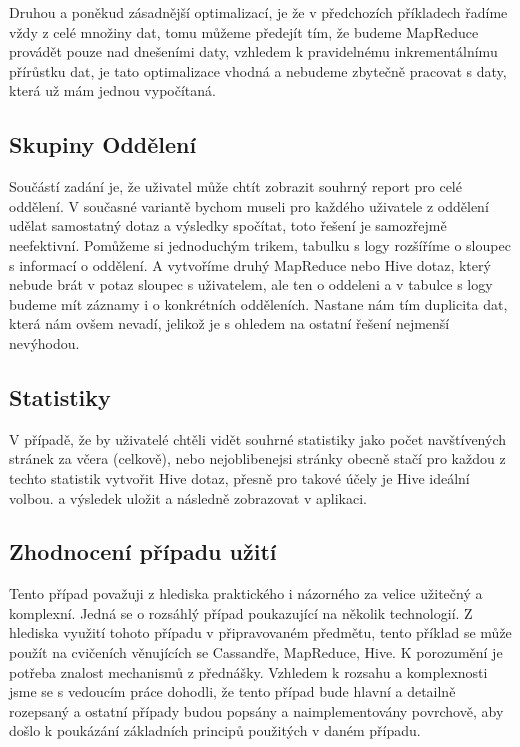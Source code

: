 Druhou a poněkud zásadnější optimalizací, je že v předchozích příkladech řadíme vždy z celé množiny dat, tomu můžeme předejít tím, že budeme MapReduce provádět pouze nad dnešeními daty, vzhledem k pravidelnému inkrementálnímu přírůstku dat, je tato optimalizace vhodná a nebudeme zbytečně pracovat s daty, která už mám jednou vypočítaná. 

\subsection{Skupiny Oddělení}
Součástí zadání je, že uživatel může chtít zobrazit souhrný report pro celé oddělení. V současné variantě bychom museli pro každého uživatele z oddělení udělat samostatný dotaz a výsledky spočítat, toto řešení je samozřejmě neefektivní. Pomůžeme si jednoduchým trikem, tabulku s logy rozšíříme o sloupec s informací o oddělení. A vytvoříme druhý MapReduce nebo Hive dotaz, který nebude brát v potaz sloupec s uživatelem, ale ten o oddeleni a v tabulce s logy budeme mít záznamy i o konkrétních odděleních. Nastane nám tím duplicita dat, která nám ovšem nevadí, jelikož je s ohledem na ostatní řešení nejmenší nevýhodou. 

\subsection{Statistiky}
V případě, že by uživatelé chtěli vidět souhrné statistiky jako počet navštívených stránek za včera (celkově), nebo nejoblibenejsi stránky obecně stačí pro každou z techto statistik vytvořit Hive dotaz, přesně pro takové účely je Hive ideální volbou. a výsledek uložit a následně zobrazovat v aplikaci. 

\subsection{Zhodnocení případu užití}
Tento případ považuji z hlediska praktického i názorného za velice užitečný a komplexní. Jedná se o rozsáhlý případ poukazující na několik technologií. Z hlediska využití tohoto případu v připravovaném předmětu, tento příklad se může použít na cvičeních věnujících se Cassandře, MapReduce, Hive. K porozumění je potřeba znalost mechanismů z přednášky. Vzhledem k rozsahu a komplexnosti jsme se s vedoucím práce dohodli, že tento případ bude hlavní a detailně rozepsaný a ostatní případy budou popsány a naimplementovány povrchově, aby došlo k poukázání základních principů použitých v daném případu. 


